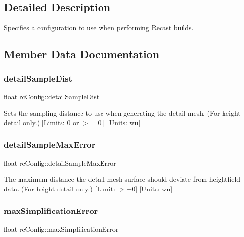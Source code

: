 \subsection{Detailed Description}
Specifies a configuration to use when performing Recast builds. 

\subsection{Member Data Documentation}
\mbox{\label{structrcConfig_abdc131d1c8f5e4c1f09a68702efba604}} 
\subsubsection{\texorpdfstring{detail\+Sample\+Dist}{detailSampleDist}}
{\footnotesize\ttfamily float rc\+Config\+::detail\+Sample\+Dist}

Sets the sampling distance to use when generating the detail mesh. (For height detail only.) \mbox{[}Limits\+: 0 or $>$= 0.\mbox{]} \mbox{[}Units\+: wu\mbox{]} \mbox{\label{structrcConfig_ae53de5fcf0777c0be9e3cd91c9da3d1f}} 
\subsubsection{\texorpdfstring{detail\+Sample\+Max\+Error}{detailSampleMaxError}}
{\footnotesize\ttfamily float rc\+Config\+::detail\+Sample\+Max\+Error}

The maximum distance the detail mesh surface should deviate from heightfield data. (For height detail only.) \mbox{[}Limit\+: $>$=0\mbox{]} \mbox{[}Units\+: wu\mbox{]} \mbox{\label{structrcConfig_aaea41eac9de6fed7a068b328ff550601}} 
\subsubsection{\texorpdfstring{max\+Simplification\+Error}{maxSimplificationError}}
{\footnotesize\ttfamily float rc\+Config\+::max\+Simplification\+Error}

